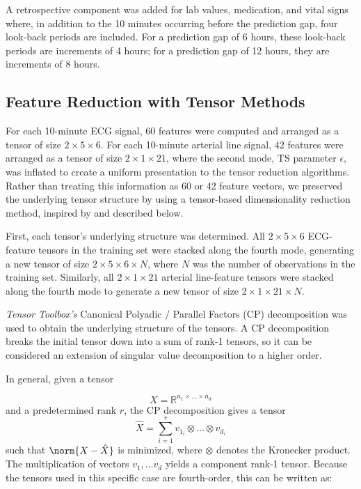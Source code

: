 A retrospective component was added for lab values, medication, and vital signs where, in addition to the 10 minutes occurring before the prediction gap, four look-back periods are included. For a prediction gap of 6 hours, these look-back periods are increments of 4 hours; for a prediction gap of 12 hours, they are increments of 8 hours.

\subsection{Feature Reduction with Tensor Methods} \label{sec:methods_tensor}

For each 10-minute ECG signal, 60 features were computed and arranged as a tensor of size $2\times5\times6$. For each 10-minute arterial line signal, 42 features were arranged as a tensor of size $2\times1\times21$, where the second mode, TS parameter $\epsilon$, was inflated to create a uniform presentation to the tensor reduction algorithms. Rather than treating this information as 60 or 42 feature vectors, we preserved the underlying tensor structure by using a tensor-based dimensionality reduction method, inspired by \cite{hernandez_multimodal_2021} and described below.

First, each tensor's underlying structure was determined. All $2 \times 5 \times 6$ ECG-feature tensors in the training set were stacked along the fourth mode, generating a new tensor of size $2 \times 5 \times 6 \times N$, where $N$ was the number of observations in the training set. Similarly, all $2 \times 1 \times 21$ arterial line-feature tensors were stacked along the fourth mode to generate a new tensor of size $2 \times 1 \times 21 \times N$.

\textit{Tensor Toolbox's} \cite{tensor_toolbox_gitlab} Canonical Polyadic / Parallel Factors (CP) decomposition \cite{kolda_tensors} was used to obtain the underlying structure of the tensors. A CP decomposition breaks the initial tensor down into a sum of rank-1 tensors, so it can be considered an extension of singular value decomposition to a higher order. 

In general, given a tensor

\begin{equation*}
    X = \mathbb{R}^{n_1 \times \dots \times n_d}
\end{equation*}
and a predetermined rank $r$, the CP decomposition gives a tensor
\begin{equation*}
    \hat{X} = \sum^{r}_{i=1} v_{1_{i}} \otimes \dots \otimes v_{d_{i}}
\end{equation*}
such that $\norm{X - \hat{X}}$ is minimized, where $\otimes$ denotes the Kronecker product. The multiplication of vectors $v_1, \dots v_d$ yields a component rank-1 tensor. Because the tensors used in this specific case are fourth-order, this can be written as:

